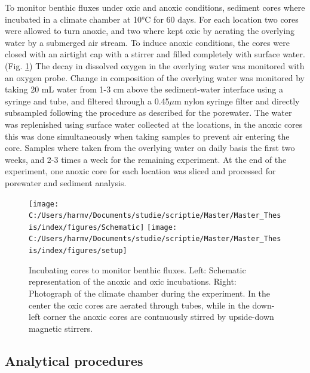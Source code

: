 \documentclass[a4paper,11pt]{article}
\begin{document}
To monitor benthic fluxes under oxic and anoxic conditions, sediment cores where incubated in a climate chamber at 10°C for 60 days. For each location two cores were allowed to turn anoxic, and two where kept oxic by aerating the overlying water by a submerged air stream. To induce anoxic conditions, the cores were closed with an airtight cap with a stirrer and filled completely with surface water. (Fig. \ref{fig:setup}) The decay in dissolved oxygen in the overlying water was monitored with an oxygen probe. Change in composition of the overlying water was monitored by taking 20 mL water from 1-3 cm above the sediment-water interface using a syringe and tube, and filtered through a 0.45\(\mu\)m nylon syringe filter and directly subsampled following the procedure as described for the porewater. The water was replenished using surface water collected at the locations, in the anoxic cores this was done simultaneously when taking samples to prevent air entering the core. Samples where taken from the overlying water on daily basis the first two weeks, and 2-3 times a week for the remaining experiment. At the end of the experiment, one anoxic core for each location was sliced and processed for porewater and sediment analysis.
\begin{figure}

{\centering \texttt{[image: C:/Users/harmv/Documents/studie/scriptie/Master/Master\_Thesis/index/figures/Schematic]} \texttt{[image: C:/Users/harmv/Documents/studie/scriptie/Master/Master\_Thesis/index/figures/setup]} 

}

\caption{Incubating cores to monitor benthic fluxes. Left: Schematic representation of the anoxic and oxic incubations. Right: Photograph of the climate chamber during the experiment. In the center the oxic cores are aerated through tubes, while in the down-left corner the anoxic cores are contnuously stirred by upside-down magnetic stirrers.}\label{fig:setup}
\end{figure}
\hypertarget{analytical-procedures}{%
\subsection{Analytical procedures}\label{analytical-procedures}}
\end{document}
